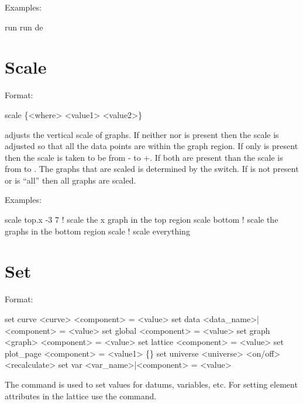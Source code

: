 Examples:
\begin{example}
  run 
  run de
\end{example}

\section{Scale}
\label{s:scale}

Format:
\begin{example}
  scale \{<where> <value1> <value2>\}
\end{example}

\vskip 0.2in 
 adjusts the vertical scale of graphs. If neither
 nor  is present then the scale is adjusted
so that all the data points are within the graph region.  If only
 is present then the scale is taken to be from
- to +. If both are present than the scale
is from  to .  The graphs that are scaled is
determined by the  switch. If  is not present
or  is ``all'' then all graphs are scaled.

Examples:
\begin{example}
  scale top.x -3  7  ! scale the x graph in the top region
  scale bottom       ! scale the graphs in the bottom region
  scale              ! scale everything
\end{example}


\section{Set}
\label{s:set}

Format:
\begin{example}
  set curve <curve> <component> = <value>
  set data <data_name>|<component> = <value>
  set global <component> = <value>
  set graph <graph> <component> = <value>
  set lattice <component> = <value>
  set plot_page <component> = <value1> \{<value2>\}
  set universe <universe> <on/off> <recalculate>
  set var <var_name>|<component> = <value>
\end{example}

\vskip 0.2in 
The  command is used to set values for datums,
variables, etc.  For setting element attributes in the 
lattice use the  command.

